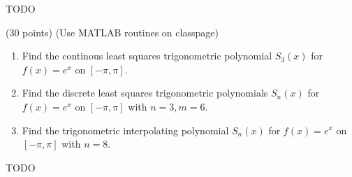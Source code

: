 \documentclass[10pt]{jhwhw}
\begin{document}
\solution

	TODO

\problem{} (30 points) (Use MATLAB routines on classpage)

	\begin{enumerate}
		\item Find the continous least squares trigonometric polynomial $S_3(x)$ for
			$f(x) = e^x$ on $[-\pi,\pi]$.
		\item Find the discrete least squares trigonometric polynomials $S_n(x)$ for
			$f(x) = e^x$ on $[-\pi, \pi]$ with $n=3, m=6$.
		\item Find the trigonometric interpolating polynomial $S_n(x)$ for 
			$f(x) = e^x$ on $[-\pi, \pi]$ with $n=8$.
	\end{enumerate}

\solution

	TODO
\end{document}
